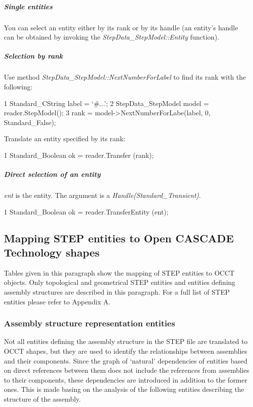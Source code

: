 \subparagraph*{Single entities}

You can select an entity either by its rank or by its handle (an entity’s handle can be obtained by invoking the {\itshape Step\+Data\+\_\+\+Step\+Model\+::\+Entity} function).

\subparagraph*{Selection by rank}

Use method {\itshape Step\+Data\+\_\+\+Step\+Model\+::\+Next\+Number\+For\+Label} to find its rank with the following\+: 
\begin{DoxyCode}
1 Standard\_CString label = ‘#...’; 
2 StepData\_StepModel model = reader.StepModel(); 
3 rank = model->NextNumberForLabe(label, 0, Standard\_False); 
\end{DoxyCode}
 Translate an entity specified by its rank\+: 
\begin{DoxyCode}
1 Standard\_Boolean ok = reader.Transfer (rank); 
\end{DoxyCode}


\subparagraph*{Direct selection of an entity}

{\itshape ent} is the entity. The argument is a {\itshape Handle(\+Standard\+\_\+\+Transient)}. 
\begin{DoxyCode}
1 Standard\_Boolean ok = reader.TransferEntity (ent); 
\end{DoxyCode}
\hypertarget{occt_user_guides__step_occt_step_2_4}{}\subsection{Mapping S\+T\+E\+P entities to Open C\+A\+S\+C\+A\+D\+E Technology shapes}\label{occt_user_guides__step_occt_step_2_4}
Tables given in this paragraph show the mapping of S\+T\+EP entities to O\+C\+CT objects. Only topological and geometrical S\+T\+EP entities and entities defining assembly structures are described in this paragraph. For a full list of S\+T\+EP entities please refer to Appendix A.\hypertarget{occt_user_guides__step_occt_step_2_4_1}{}\subsubsection{Assembly structure representation entities}\label{occt_user_guides__step_occt_step_2_4_1}
Not all entities defining the assembly structure in the S\+T\+EP file are translated to O\+C\+CT shapes, but they are used to identify the relationships between assemblies and their components. Since the graph of ‘natural’ dependencies of entities based on direct references between them does not include the references from assemblies to their components, these dependencies are introduced in addition to the former ones. This is made basing on the analysis of the following entities describing the structure of the assembly.


